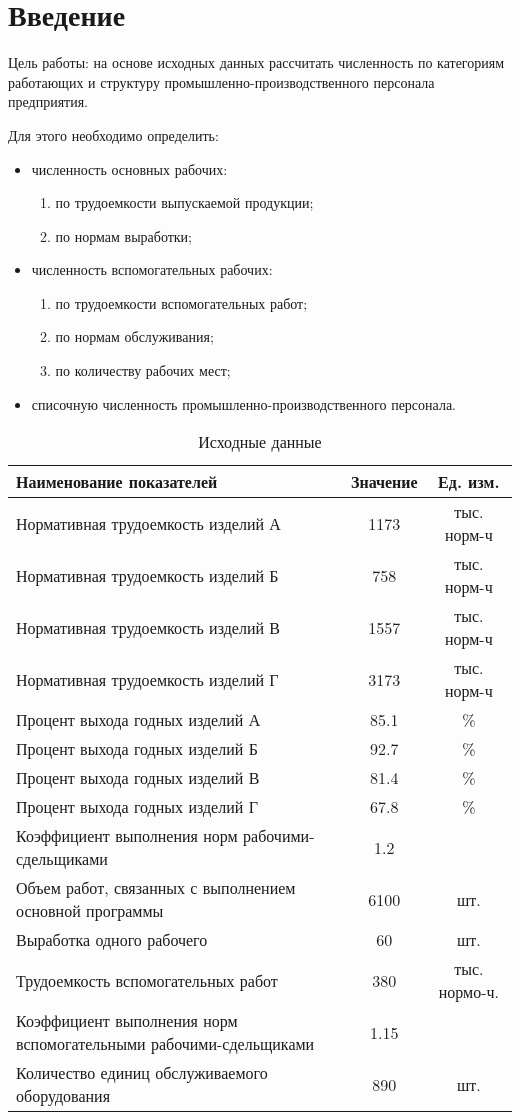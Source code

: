 \chapter{Введение}

Цель работы: на основе исходных данных рассчитать численность по категориям работающих и структуру промышленно-производственного персонала предприятия.

Для этого необходимо определить:
\begin{itemize}
	\item численность основных рабочих:
	\begin{enumerate}
		\item по трудоемкости выпускаемой продукции;
		\item по нормам выработки;
	\end{enumerate}
	\item численность вспомогательных рабочих:
	\begin{enumerate}
		\item по трудоемкости вспомогательных работ;
		\item по нормам обслуживания;
		\item по количеству рабочих мест;
	\end{enumerate}
	\item списочную численность промышленно-производственного персонала.
	
\end{itemize}

\begin{table}
	\caption{Исходные данные}
	\begin{tabular}{|p{10cm}|c|c|}
		\hline
		Наименование показателей & Значение & Ед. изм. \\ \hline
		Нормативная трудоемкость изделий А & 1173 & тыс. норм-ч \\ \hline
		Нормативная трудоемкость изделий Б & 758 & тыс. норм-ч \\ \hline		
		Нормативная трудоемкость изделий В & 1557 & тыс. норм-ч \\ \hline
		Нормативная трудоемкость изделий Г & 3173 & тыс. норм-ч \\ \hline
		Процент выхода годных изделий А & 85.1 & \% \\ \hline
		Процент выхода годных изделий Б & 92.7 & \% \\ \hline
		Процент выхода годных изделий В & 81.4 & \% \\ \hline
		Процент выхода годных изделий Г & 67.8 & \% \\ \hline				
		Коэффициент выполнения норм рабочими-сдельщиками & 1.2 & \\ \hline
		Объем работ, связанных с выполнением основной программы & 6100 & шт. \\ \hline
		Выработка одного рабочего & 60 & шт. \\ \hline
		Трудоемкость вспомогательных работ & 380 & тыс. нормо-ч. \\ \hline
		Коэффициент выполнения норм вспомогательными рабочими-сдельщиками & 1.15 & \\ \hline
		Количество единиц обслуживаемого оборудования & 890 & шт. \\ \hline
	\end{tabular}
\end{table}